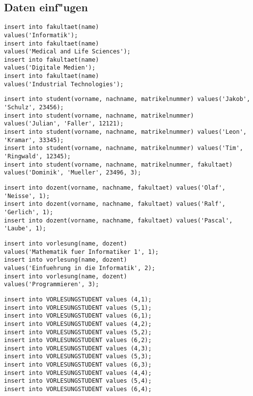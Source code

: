\documentclass[a4paper, 11pt, titlepage]{article}
\begin{document}
\subsection{Daten einf"ugen}
\begin{lstlisting}[style = sql]
insert into fakultaet(name)
values('Informatik');
insert into fakultaet(name) 
values('Medical and Life Sciences');
insert into fakultaet(name) 
values('Digitale Medien');
insert into fakultaet(name) 
values('Industrial Technologies');
\end{lstlisting}
\begin{lstlisting}[style = sql]
insert into student(vorname, nachname, matrikelnummer) values('Jakob', 'Schulz', 23456);
insert into student(vorname, nachname, matrikelnummer) values('Julian', 'Faller', 12121);
insert into student(vorname, nachname, matrikelnummer) values('Leon', 'Kramar', 33345);
insert into student(vorname, nachname, matrikelnummer) values('Tim', 'Ringwald', 12345);
insert into student(vorname, nachname, matrikelnummer, fakultaet) values('Dominik', 'Mueller', 23496, 3);
\end{lstlisting}
\begin{lstlisting}[style = sql]
insert into dozent(vorname, nachname, fakultaet) values('Olaf', 'Neisse', 1);
insert into dozent(vorname, nachname, fakultaet) values('Ralf', 'Gerlich', 1);
insert into dozent(vorname, nachname, fakultaet) values('Pascal', 'Laube', 1);
\end{lstlisting}
\begin{lstlisting}[style = sql]
insert into vorlesung(name, dozent) 
values('Mathematik fuer Informatiker 1', 1);
insert into vorlesung(name, dozent) 
values('Einfuehrung in die Informatik', 2);
insert into vorlesung(name, dozent) 
values('Programmieren', 3);
\end{lstlisting}
\newpage
\begin{lstlisting}[style = sql]
insert into VORLESUNGSTUDENT values (4,1);
insert into VORLESUNGSTUDENT values (5,1);
insert into VORLESUNGSTUDENT values (6,1);
insert into VORLESUNGSTUDENT values (4,2);
insert into VORLESUNGSTUDENT values (5,2);
insert into VORLESUNGSTUDENT values (6,2);
insert into VORLESUNGSTUDENT values (4,3);
insert into VORLESUNGSTUDENT values (5,3);
insert into VORLESUNGSTUDENT values (6,3);
insert into VORLESUNGSTUDENT values (4,4);
insert into VORLESUNGSTUDENT values (5,4);
insert into VORLESUNGSTUDENT values (6,4);
\end{lstlisting}
\end{document}
